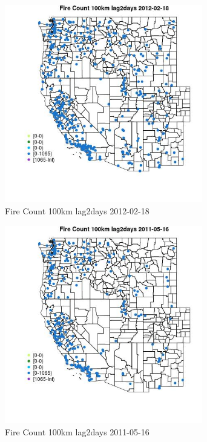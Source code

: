 \begin{figure} 
\centering  
\includegraphics[width=0.77\textwidth]{Code_Outputs/Report_ML_input_PM25_Step4_part_f_de_duplicated_aveswNAs_MapObsFire_Count_100km_lag2days2012-02-18.jpg} 
\caption{\label{fig:Report_ML_input_PM25_Step4_part_f_de_duplicated_aveswNAsMapObsFire_Count_100km_lag2days2012-02-18}Fire Count 100km lag2days 2012-02-18} 
\end{figure} 
 

\clearpage 

\begin{figure} 
\centering  
\includegraphics[width=0.77\textwidth]{Code_Outputs/Report_ML_input_PM25_Step4_part_f_de_duplicated_aveswNAs_MapObsFire_Count_100km_lag2days2011-05-16.jpg} 
\caption{\label{fig:Report_ML_input_PM25_Step4_part_f_de_duplicated_aveswNAsMapObsFire_Count_100km_lag2days2011-05-16}Fire Count 100km lag2days 2011-05-16} 
\end{figure} 
 

